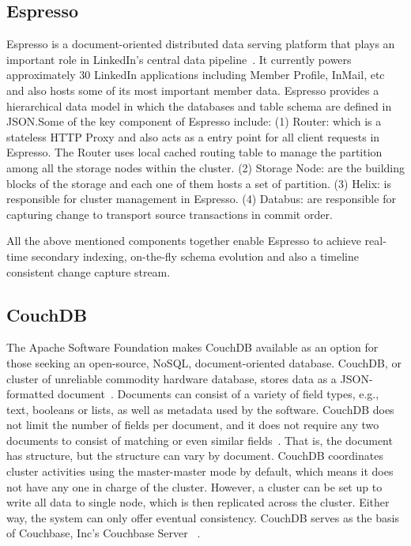 \subsection{Espresso}

Espresso is a document-oriented distributed data serving platform that
plays an important role in LinkedIn's central data
pipeline~\cite{www-Linkedin-Espresso}.  It currently powers
approximately 30 LinkedIn applications including Member Profile,
InMail, etc and also hosts some of its most important member
data. Espresso provides a hierarchical data model in which the
databases and table schema are defined in JSON.Some of the key
component of Espresso include: (1) Router: which is a stateless HTTP
Proxy and also acts as a entry point for all client requests in
Espresso. The Router uses local cached routing table to manage the
partition among all the storage nodes within the cluster. (2) Storage
Node: are the building blocks of the storage and each one of them
hosts a set of partition. (3) Helix: is responsible for cluster
management in Espresso. (4) Databus: are responsible for capturing
change to transport source transactions in commit order.

     All the above mentioned components together enable Espresso to achieve 
     real-time secondary indexing, on-the-fly schema evolution and also a 
     timeline consistent change capture stream.

     \pv

\subsection{CouchDB \cv}
     
The Apache Software Foundation makes CouchDB available as an option
for those seeking an open-source, NoSQL, document-oriented
database. CouchDB, or cluster of unreliable commodity hardware
database, stores data as a JSON-formatted
document~\cite{www-exploringcdb-couchdb}.  Documents can consist of a
variety of field types, e.g., text, booleans or lists, as well as
metadata used by the software. CouchDB does not limit the number of
fields per document, and it does not require any two documents to
consist of matching or even similar
fields~\cite{www-techoverview-couchdb}. That is, the document has
structure, but the structure can vary by document.  CouchDB
coordinates cluster activities using the master-master mode by
default, which means it does not have any one in charge of the
cluster.  However, a cluster can be set up to write all data to single
node, which is then replicated across the cluster.  Either way, the
system can only offer eventual consistency. CouchDB serves as the
basis of Couchbase, Inc's Couchbase Server
~\cite{www-cdb-vs-cbs-couchdb}.

